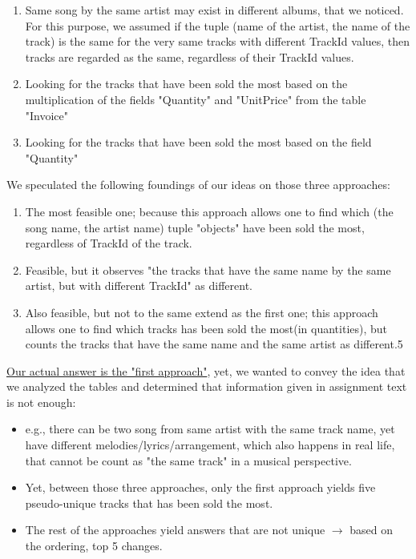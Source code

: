 \documentclass[10pt]{article}
\newcommand{\indentitem}{\setlength\itemindent{25pt}}
\begin{document}
				\begin{enumerate}
					\indentitem
					
					\item Same song by the same artist may exist in different albums, that we noticed. For this purpose, we assumed if the tuple (name of the artist, the name of the track) is the same for the very same tracks with different TrackId values, then tracks are regarded as the same, regardless of their TrackId values.

					\item Looking for the tracks that have been sold the most based on the multiplication of the fields "Quantity" and "UnitPrice" from the table "Invoice"
					
					\item Looking for the tracks that have been sold the most based on the field "Quantity"
					
				\end{enumerate}
				
				We speculated the following foundings of our ideas on those three approaches:
				
				\begin{enumerate}
					\indentitem
					
					\item The most feasible one; because this approach allows one to find which (the song name, the artist name) tuple "objects" have been sold the most, regardless of TrackId of the track.
					
					\item Feasible, but it observes "the tracks that have the same name by the same artist, but with different TrackId" as different.
					
					\item Also feasible, but not to the same extend as the first one; this approach allows one to find which tracks has been sold the most(in quantities), but counts the tracks that have the same name and the same artist as different.5
			
				\end{enumerate}
				
				\underline{Our actual answer is the "first approach"}, yet, we wanted to convey the idea that we analyzed the tables and determined that information given in assignment text is not enough:
				
				\begin{itemize}
					\item 	e.g., there can be two song from same artist with the same track name, yet have different melodies/lyrics/arrangement, which also happens in real life, that cannot be count as "the same track" in a musical perspective.
					
					\item Yet, between those three approaches, only the first approach yields five pseudo-unique tracks that has been sold the most.
					
					\item  The rest of the approaches yield answers that are not unique $\rightarrow$ based on the ordering, top 5 changes.
				\end{itemize}
				
\end{document}
